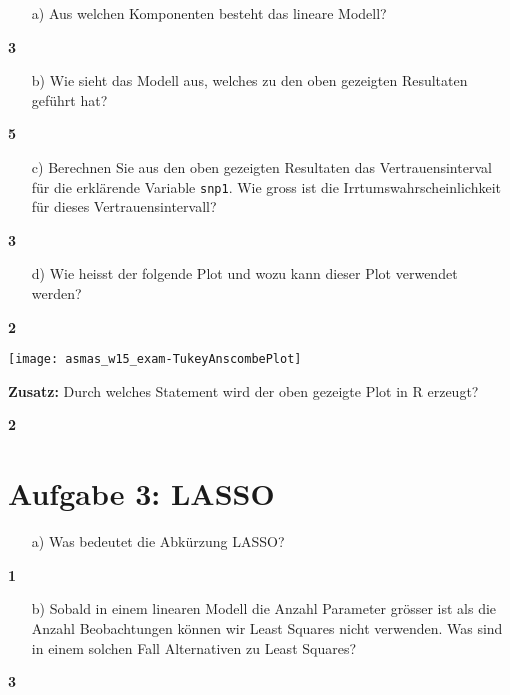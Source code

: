 \documentclass{scrartcl}
\newcommand{\points}[1]
{\begin{flushright}\textbf{#1}\end{flushright}}
\begin{document}
\begin{enumerate}
\item[a)] Aus welchen Komponenten besteht das lineare Modell?
\end{enumerate}
\points{3}


\clearpage
\pagebreak

\begin{enumerate}
\item[b)] Wie sieht das Modell aus, welches zu den oben gezeigten Resultaten gef\"uhrt hat?
\end{enumerate}
\points{5}


\clearpage
\pagebreak

\begin{enumerate}
\item[c)] Berechnen Sie aus den oben gezeigten Resultaten das Vertrauensinterval f\"ur die erkl\"arende Variable \verb+snp1+. Wie gross ist die Irrtumswahrscheinlichkeit f\"ur dieses Vertrauensintervall?
\end{enumerate}
\points{3}


\clearpage
\pagebreak

\begin{enumerate}
\item[d)] Wie heisst der folgende Plot und wozu kann dieser Plot verwendet werden?
\end{enumerate}
\points{2}

\texttt{[image: asmas\_w15\_exam-TukeyAnscombePlot]}




\clearpage
\pagebreak

\noindent\textbf{Zusatz:} Durch welches Statement wird der oben gezeigte Plot in R erzeugt?

\points{2}



\clearpage
\pagebreak

\section*{Aufgabe 3: LASSO}

\begin{enumerate}
\item[a)] Was bedeutet die Abk\"urzung LASSO?
\end{enumerate}
\points{1}


\clearpage
\pagebreak

\begin{enumerate}
\item[b)] Sobald in einem linearen Modell die Anzahl Parameter gr\"osser ist als die Anzahl Beobachtungen k\"onnen wir Least Squares nicht verwenden. Was sind in einem solchen Fall Alternativen zu Least Squares?
\end{enumerate}
\points{3}
\end{document}
